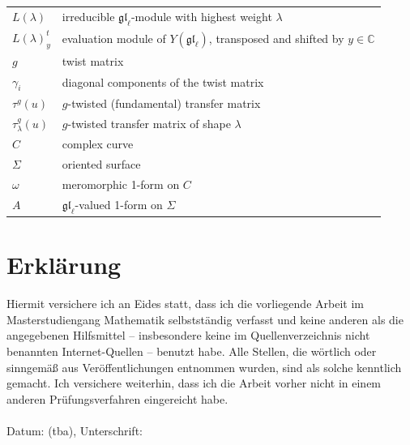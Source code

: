 \documentclass[11pt]{report}
\theoremstyle{definition}
\theoremstyle{remark}
\theoremstyle{remark}
\newcommand{\C}{\mathbb{C}}
\begin{document}
\begin{tabular}{l|l}
$L(\lambda)$ & irreducible $\mathfrak{gl}_\ell$-module with highest weight $\lambda$ \\
$L(\lambda)_y^t$ & evaluation module of $Y(\mathfrak{gl}_\ell)$, transposed and shifted by $y \in \C$ \\
$g$ & twist matrix \\
$\gamma_i$ & diagonal components of the twist matrix \\
$\tau^g(u)$ & $g$-twisted (fundamental) transfer matrix \\
$\tau_\lambda^g(u)$ & $g$-twisted transfer matrix of shape $\lambda$ \\
$C$ & complex curve \\
$\Sigma$ & oriented surface \\
$\omega$ & meromorphic 1-form on $C$ \\
$A$ & $\mathfrak{gl}_\ell$-valued 1-form on $\Sigma$
\end{tabular}

\pagebreak

\printindex




\pagebreak

\section*{Erklärung}

Hiermit versichere ich an Eides statt, dass ich die vorliegende Arbeit im Masterstudiengang Mathematik selbstständig verfasst und keine anderen als die angegebenen Hilfsmittel – insbesondere keine im Quellenverzeichnis nicht benannten Internet-Quellen – benutzt habe. Alle Stellen, die wörtlich oder sinngemäß aus Veröffentlichungen entnommen wurden, sind als solche kenntlich gemacht. Ich versichere weiterhin, dass ich die Arbeit vorher nicht in einem anderen Prüfungsverfahren eingereicht habe.
~\\~\\
Datum: (tba), Unterschrift:

\end{document}
